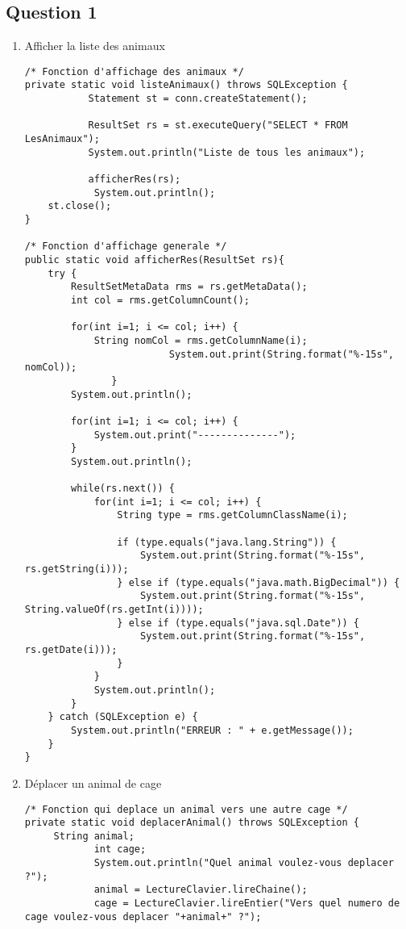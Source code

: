 \documentclass{article}
\begin{document}
\subsection*{Question 1}
\begin{enumerate}[label=\arabic*)]
	\item Afficher la liste des animaux

	\begin{lstlisting}
/* Fonction d'affichage des animaux */
private static void listeAnimaux() throws SQLException {
           Statement st = conn.createStatement();

           ResultSet rs = st.executeQuery("SELECT * FROM LesAnimaux");
           System.out.println("Liste de tous les animaux");

           afficherRes(rs);       
          	System.out.println();
	st.close();
}

/* Fonction d'affichage generale */
public static void afficherRes(ResultSet rs){
	try {
		ResultSetMetaData rms = rs.getMetaData();
		int col = rms.getColumnCount();
		
		for(int i=1; i <= col; i++) {
			String nomCol = rms.getColumnName(i);
	                     System.out.print(String.format("%-15s", nomCol));
	           }
		System.out.println();
	                    
		for(int i=1; i <= col; i++) {
			System.out.print("--------------");
		}
		System.out.println();
	
		while(rs.next()) {
			for(int i=1; i <= col; i++) {
				String type = rms.getColumnClassName(i);
	                                    
				if (type.equals("java.lang.String")) {
					System.out.print(String.format("%-15s", rs.getString(i)));
				} else if (type.equals("java.math.BigDecimal")) {
					System.out.print(String.format("%-15s", String.valueOf(rs.getInt(i))));                                  
				} else if (type.equals("java.sql.Date")) {
					System.out.print(String.format("%-15s", rs.getDate(i)));
				}                             
			}
			System.out.println();
		}
	} catch (SQLException e) {
		System.out.println("ERREUR : " + e.getMessage());
	}
}
	\end{lstlisting}

	\item Déplacer un animal de cage

	\begin{lstlisting}
/* Fonction qui deplace un animal vers une autre cage */
private static void deplacerAnimal() throws SQLException {
	 String animal;
            int cage;
            System.out.println("Quel animal voulez-vous deplacer ?");
            animal = LectureClavier.lireChaine();
            cage = LectureClavier.lireEntier("Vers quel numero de cage voulez-vous deplacer "+animal+" ?");
            

\end{lstlisting}
\end{enumerate}
\end{document}
